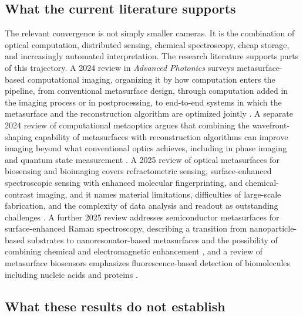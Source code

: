\documentclass[11pt]{article}
\theoremstyle{plain}
\theoremstyle{definition}
\theoremstyle{remark}
\begin{document}
\subsection{What the current literature supports}

The relevant convergence is not simply smaller cameras. It is the combination of optical computation, distributed sensing, chemical spectroscopy, cheap storage, and increasingly automated interpretation. The research literature supports parts of this trajectory. A 2024 review in \emph{Advanced Photonics} surveys metasurface-based computational imaging, organizing it by how computation enters the pipeline, from conventional metasurface design, through computation added in the imaging process or in postprocessing, to end-to-end systems in which the metasurface and the reconstruction algorithm are optimized jointly \cite{hu2024}. A separate 2024 review of computational metaoptics argues that combining the wavefront-shaping capability of metasurfaces with reconstruction algorithms can improve imaging beyond what conventional optics achieves, including in phase imaging and quantum state measurement \cite{roques2024}. A 2025 review of optical metasurfaces for biosensing and bioimaging covers refractometric sensing, surface-enhanced spectroscopic sensing with enhanced molecular fingerprinting, and chemical-contrast imaging, and it names material limitations, difficulties of large-scale fabrication, and the complexity of data analysis and readout as outstanding challenges \cite{elhelou2025}. A further 2025 review addresses semiconductor metasurfaces for surface-enhanced Raman spectroscopy, describing a transition from nanoparticle-based substrates to nanoresonator-based metasurfaces and the possibility of combining chemical and electromagnetic enhancement \cite{beres2025}, and a review of metasurface biosensors emphasizes fluorescence-based detection of biomolecules including nucleic acids and proteins \cite{iwanaga2025}.

\subsection{What these results do not establish}
\end{document}
